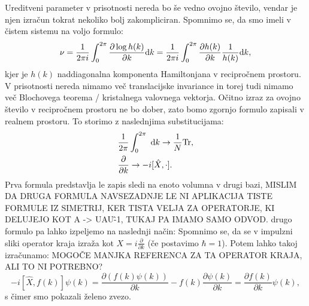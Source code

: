 Ureditveni parameter v prisotnosti nereda bo še vedno ovojno število, vendar je njen izračun tokrat nekoliko bolj zakompliciran.
Spomnimo se, da smo imeli v čistem sistemu na voljo formulo:
\begin{equation}
\nu = \frac{1}{2 \pi i} \int_0^{2 \pi} \frac{\partial \log h(k)}{\partial k} \textup{d}k = \frac{1}{2 \pi i} \int_0^{2 \pi} \frac{\partial h(k)}{\partial k} \frac{1}{h(k)} \textup{d}k,
\end{equation}
kjer je $h(k)$ naddiagonalna komponenta Hamiltonjana v recipročnem prostoru. V prisotnosti nereda nimamo več translacijske invariance in torej tudi nimamo več Blochovega teorema / kristalnega valovnega vektorja. Očitno izraz za ovojno število v recipročnem prostoru ne bo dober, zato bomo zgornjo formulo zapisali v realnem prostoru.
To storimo z naslednjima substitucijama:
\begin{align}
&\frac{1}{2 \pi} \int_0^{2 \pi}\  \textup{d}k \to \frac{1}{N} \mathrm{Tr}, \\
&\frac{\partial}{\partial k} \to  -i [\hat{X}, \cdot ]. 
\end{align}
Prva formula predstavlja le zapis sledi na enoto volumna v drugi bazi, MISLIM DA DRUGA FORMULA NAVSEZADNJE LE NI APLIKACIJA TISTE FORMULE IZ SIMETRIJ, KER TISTA  VELJA ZA OPERATORJE, KI DELUJEJO KOT A -> UAU\^-1, TUKAJ PA IMAMO SAMO ODVOD. drugo formulo pa lahko izpeljemo na naslednji način: 
Spomnimo se, da se v impulzni sliki operator kraja izraža kot $X = i \frac{\partial}{\partial k}$ (če postavimo $\hbar = 1$). Potem lahko takoj izračunamo: MOGOČE MANJKA REFERENCA ZA TA OPERATOR KRAJA, ALI TO NI POTREBNO?
\begin{equation}
 -i [\hat{X}, f(k)] \psi(k) =  \frac{\partial \left(f(k) \psi(k) \right)}{\partial k} - f(k) \frac{\partial \psi(k)}{\partial k} = \frac{\partial f(k)}{\partial k} \psi(k),
\end{equation}
s čimer smo pokazali želeno zvezo.


